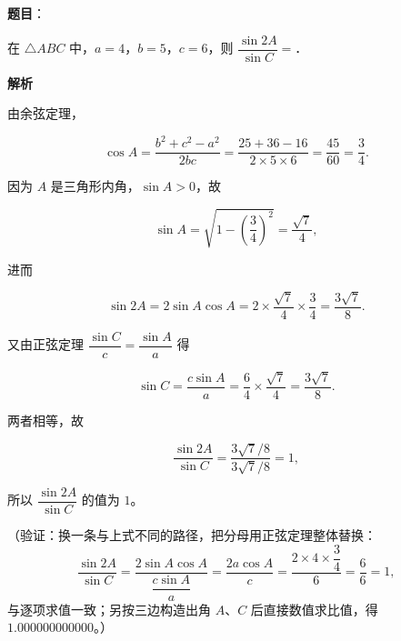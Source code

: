 \begin{answer}

\textbf{题目}：

在 \(\triangle ABC\) 中，\(a=4\)，\(b=5\)，\(c=6\)，则 \(\dfrac{\sin 2A}{\sin C}=\)\gkblank{}．

\textbf{解析}

由余弦定理，

\nopagebreak[4]
\[
\cos A=\frac{b^{2}+c^{2}-a^{2}}{2bc}=\frac{25+36-16}{2\times5\times6}=\frac{45}{60}=\frac{3}{4}.
\]

因为 \(A\) 是三角形内角，\(\sin A>0\)，故

\nopagebreak[4]
\[
\sin A=\sqrt{1-\left(\frac{3}{4}\right)^{2}}=\frac{\sqrt{7}}{4},
\]

进而

\nopagebreak[4]
\[
\sin 2A=2\sin A\cos A=2\times\frac{\sqrt{7}}{4}\times\frac{3}{4}=\frac{3\sqrt{7}}{8}.
\]

又由正弦定理 \(\dfrac{\sin C}{c}=\dfrac{\sin A}{a}\) 得

\nopagebreak[4]
\[
\sin C=\frac{c\sin A}{a}=\frac{6}{4}\times\frac{\sqrt{7}}{4}=\frac{3\sqrt{7}}{8}.
\]

两者相等，故

\nopagebreak[4]
\[
\frac{\sin 2A}{\sin C}=\frac{3\sqrt{7}/8}{3\sqrt{7}/8}=1,
\]

所以 \(\dfrac{\sin 2A}{\sin C}\) 的值为 \(1\)。

（验证：换一条与上式不同的路径，把分母用正弦定理整体替换：
\nopagebreak[4]
\[
\frac{\sin 2A}{\sin C}=\frac{2\sin A\cos A}{\dfrac{c\sin A}{a}}=\frac{2a\cos A}{c}=\frac{2\times4\times\dfrac{3}{4}}{6}=\frac{6}{6}=1,
\]
与逐项求值一致；另按三边构造出角 \(A\)、\(C\) 后直接数值求比值，得 \(1.000000000000\)。）


\end{answer}
